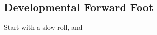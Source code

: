 \subsection*{Developmental Forward Foot}
\label{drill:one_foot_hockey:developmental_forward}

Start with a slow roll, and  
